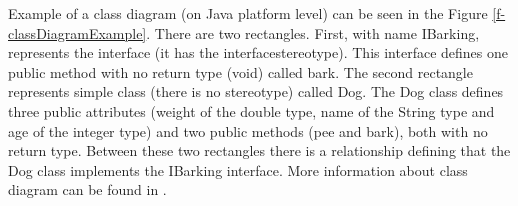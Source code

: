 Example of a class diagram (on Java platform level) can be seen in the Figure \ref{f-classDiagramExample}. There are two rectangles. First, with name IBarking, represents the interface (it has the \guillemotleft{}interface\guillemotright stereotype). This interface defines one public method with no return type (void) called bark. The second rectangle represents simple class (there is no stereotype) called Dog. The Dog class defines three public attributes (weight of the double type, name of the String type and age of the integer type) and two public methods (pee and bark), both with no return type. Between these two rectangles there is a relationship defining that the Dog class implements the IBarking interface. More information about class diagram can be found in \cite{UMLDistilled}.
